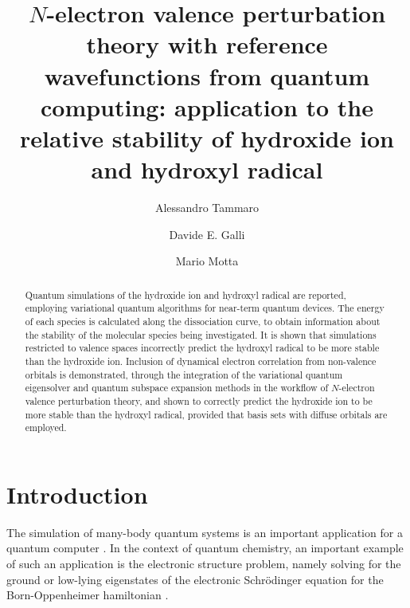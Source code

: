 \documentclass[aps,pra,twocolumn]{revtex4-2}
\begin{document}
\title{$N$-electron valence perturbation theory with reference wavefunctions from quantum computing:
application to the relative stability of hydroxide ion and hydroxyl radical}

\author{Alessandro Tammaro}
\author{Davide E. Galli}
\author{Mario Motta}

\begin{abstract}
Quantum simulations of the hydroxide ion and hydroxyl radical are reported, employing variational quantum algorithms for near-term quantum devices.
The energy of each species is calculated along the dissociation curve, to obtain information about the stability of the molecular species being investigated. 
It is shown that simulations restricted to valence spaces incorrectly predict the hydroxyl radical to be more stable than the hydroxide ion.
Inclusion of dynamical electron correlation from non-valence orbitals is demonstrated,
through the integration of the variational quantum eigensolver and quantum subspace expansion methods in the workflow of $N$-electron valence perturbation theory, 
and shown to correctly predict the hydroxide ion to be more stable than the hydroxyl radical, provided that basis sets with diffuse orbitals are employed.
\end{abstract}

\maketitle

\section{Introduction}

The simulation of many-body quantum systems is an important application for a quantum computer \cite{georgescu2014quantum,cao2019quantum,cerezo2020variational,bauer2020quantum,mcardle2020quantum,motta2021emerging}. 
In the context of quantum chemistry, an important example of such an application is the electronic structure problem, 
namely solving for the ground or low-lying eigenstates of the electronic Schr\"{o}dinger equation for the Born-Oppenheimer hamiltonian \cite{friesner2005ab,helgaker2012recent,helgaker2014molecular}.
\end{document}
